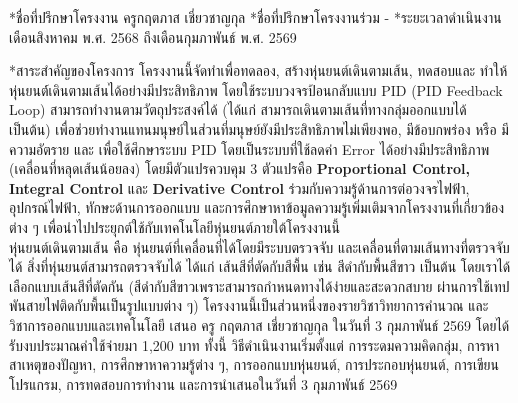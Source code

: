 \documentclass[14pt, fleqn, a4paper]{extarticle}
\makeatletter
\renewcommand\section{%
  \@ifstar{\flatsection}{\@section}%
}
\newcommand{\flatsection}[1]{%
   \par\medskip\noindent
   {\bfseries #1\par}
}
\makeatother
\begin{document}
\section*{ชื่อที่ปรึกษาโครงงาน} \vspace{-0.5em}
ครูกฤตภาส เชี่ยวชาญกุล \vspace{-0.5em}
\section*{ชื่อที่ปรึกษาโครงงานร่วม} \vspace{-0.5em}
- \vspace{-0.5em}
\section*{ระยะเวลาดำเนินงาน} \vspace{-0.5em}
เดือนสิงหาคม พ.ศ. 2568 ถึงเดือนกุมภาพันธ์ พ.ศ. 2569 \vspace{-0.5em}

\newpage

\section*{สาระสำคัญของโครงการ} \vspace{-0.5em}
โครงงานนี้จัดทำเพื่อทดลอง, สร้างหุ่นยนต์เดินตามเส้น, ทดสอบและ ทำให้หุ่นยนต์์เดินตามเส้นได้อย่างมีประสิทธิภาพ โดยใช้ระบบวงจรป้อนกลับแบบ PID (PID Feedback Loop) สามารถทำงานตามวัตถุประสงค์ได้ (ได้แก่ สามารถเดินตามเส้นที่ทางกลุ่มออกแบบได้ เป็นต้น) เพื่อช่วยทำงานแทนมนุษย์ในส่วนที่มนุษย์ยังมีประสิทธิภาพไม่เพียงพอ, มีข้อบกพร่อง หรือ มีความอัตราย และ เพื่อใช้ศึกษาระบบ PID โดยเป็นระบบที่ใช้ลดค่า Error ได้อย่างมีประสิทธิภาพ (เคลื่อนที่หลุดเส้นน้อยลง) โดยมีตัวแปรควบคุม 3 ตัวแปรคือ \textbf{Proportional Control, Integral Control} และ \textbf{Derivative Control} ร่วมกับความรู้ด้านการต่อวงจรไฟฟ้า, อุปกรณ์ไฟฟ้า, ทักษะด้านการออกแบบ และการศึกษาหาข้อมูลความรู้เพิ่มเติมจากโครงงานที่เกี่ยวข้องต่าง ๆ เพื่อนำไปประยุกต์ใช้กับเทคโนโลยีหุ่นยนต์ภายใต้โครงงานนี้ \\
\indent หุ่นยนต์เดินตามเส้น คือ หุ่นยนต์ที่เคลื่อนที่ได้โดยมีระบบตรวจจับ และเคลื่อนที่ตามเส้นทางที่ตรวจจับได้ สิ่งที่หุ่นยนต์สามารถตรวจจับได้ ได้แก่ เส้นสีที่ตัดกับสีพื้น เช่น สีดำกับพื้นสีขาว เป็นต้น โดยเราได้เลือกแบบเส้นสีที่ตัดกัน (สีดำกับสีขาวเพราะสามารถกำหนดทางได้ง่ายและสะดวกสบาย ผ่านการใช้เทปพันสายไฟติดกับพื้นเป็นรูปแบบต่าง ๆ) โครงงานนี้เป็นส่วนหนึ่งของรายวิชาวิทยาการคำนวณ และวิชาการออกแบบและเทคโนโลยี เสนอ ครู กฤตภาส เชี่ยวชาญกุล ในวันที่ 3 กุมภาพันธ์ 2569 โดยได้รับงบประมาณค่าใช้จ่ายมา 1,200 บาท ทั้งนี้ วิธีดำเนินงานเริ่มตั้งแต่ การระดมความคิดกลุ่ม, การหาสาเหตุของปัญหา, การศึกษาหาความรู้ต่าง ๆ, การออกแบบหุ่นยนต์, การประกอบหุ่นยนต์, การเขียนโปรแกรม, การทดสอบการทำงาน และการนำเสนอในวันที่ 3 กุมภาพันธ์ 2569 
\end{document}
